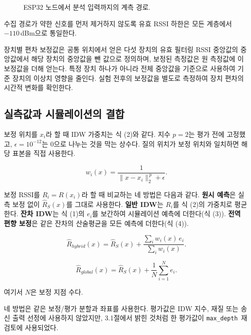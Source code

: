 \documentclass[11pt,a4paper]{article}
\newcommand{\figplaceholder}[2][0.86\textwidth]{%
  \fbox{\begin{minipage}[c][#2][c]{#1}\centering\small\color{gray}
  [그림 삽입 예정]\end{minipage}}}
\newcommand{\md}{\texttt{max\_depth}}
\begin{document}
\begin{figure}[htbp]
  \centering
  \figplaceholder{4.2cm}
  \caption{ESP32 노드에서 분석 입력까지의 계측 경로.}
  \label{fig:meas}
\end{figure}

수집 경로가 약한 신호를 먼저 제거하지 않도록 유효 RSSI 하한은 모든 계층에서 $-110$\,dBm으로
통일한다.

장치별 편차 보정값은 공통 위치에서 얻은 다섯 장치의 유효 필터링 RSSI 중앙값의 중앙값에서 해당 장치의
중앙값을 뺀 값으로 정의하며, 보정된 측정값은 원 측정값에 이 보정값을 더해 얻는다. 특정 장치 하나가 아니라
전체 중앙값을 기준으로 사용하여 기준 장치의 이상치 영향을 줄인다. 실험 전후의 보정값을 별도로 측정하여
장치 편차의 시간적 변화를 확인한다.

\subsection{실측값과 시뮬레이션의 결합}

보정 위치를 $x_i$라 할 때 IDW 가중치는 식 (2)와 같다. 지수 $p=2$는 평가 전에 고정했고,
$\epsilon=10^{-12}$는 0으로 나누는 것을 막는 상수다. 질의 위치가 보정 위치와 일치하면 해당 표본을
직접 사용한다.

\begin{equation}
  w_i(x) = \frac{1}{\lVert x-x_i \rVert_2^{\,p} + \epsilon}.
\end{equation}

보정 RSSI를 $R_i=R(x_i)$라 할 때 비교하는 네 방법은 다음과 같다. \textbf{원시 예측}은 실측 보정 없이
$\hat{R}_S(x)$를 그대로 사용한다. \textbf{일반 IDW}는 $R_i$를 식 (2)의 가중치로 평균한다.
\textbf{잔차 IDW}는 식 (1)의 $e_i$를 보간하여 시뮬레이션 예측에 더한다(식 (3)). \textbf{전역 편향
보정}은 같은 잔차의 산술평균을 모든 예측에 더한다(식 (4)).

\begin{equation}
  \hat{R}_{hybrid}(x) = \hat{R}_S(x) + \frac{\sum_i w_i(x)\,e_i}{\sum_i w_i(x)}.
\end{equation}

\begin{equation}
  \hat{R}_{global}(x) = \hat{R}_S(x) + \frac{1}{N}\sum_{i=1}^{N} e_i.
\end{equation}

여기서 $N$은 보정 지점 수다.

네 방법은 같은 보정/평가 분할과 좌표를 사용한다. 평가값은 IDW 지수, 재질 또는 송신 출력 선정에 사용하지
않았지만, 3.1절에서 밝힌 것처럼 한 평가값이 \md\ 재검토에 사용되었다.
\end{document}
